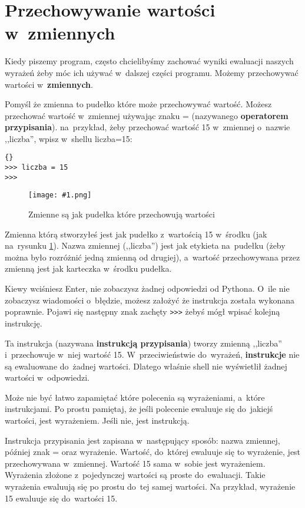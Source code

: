 \documentclass{book}
\newcommand{\img}[3]{
\begin{figure}
\centerline{
	\texttt{[image: \#1.png]}
}
\caption{#2}
\label{#1}
\end{figure}
}
\begin{document}
\section{Przechowywanie wartości w~zmiennych}

Kiedy piszemy program, często chcielibyśmy zachować wyniki ewaluacji naszych wyrażeń żeby móc ich używać w~dalszej części programu. Możemy przechowywać wartości w~{\bf zmiennych}.

Pomyśl że zmienna to pudełko które może przechowywać wartość. Możesz przechować wartość w~zmiennej używając znaku = (nazywanego {\bf operatorem przypisania}). na~przykład, żeby przechować wartość 15 w~zmiennej o~nazwie ,,liczba'', wpisz w~shellu liczba=15:

\lstset{language=python}
\begin{lstlisting}{}
>>> liczba = 15
>>>
\end{lstlisting}

\img{idle-zmienna}{Zmienne są jak pudełka które przechowują wartości}{4 cm}

Zmienna którą stworzyłeś jest jak pudełko z~wartością 15 w~środku (jak na~rysunku \ref{idle-zmienna}). Nazwa zmiennej (,,liczba'') jest jak etykieta na~pudełku (żeby można było rozróżnić jedną zmienną od drugiej), a~wartość przechowywana przez zmienną jest jak karteczka w~środku pudełka.

Kiewy wciśniesz Enter, nie zobaczysz żadnej odpowiedzi od Pythona. O~ile nie zobaczysz wiadomości o~błędzie, możesz założyć że instrukcja została wykonana poprawnie. Pojawi się następny znak zachęty \lstinline{>>>} żebyś mógł wpisać kolejną instrukcję.

Ta instrukcja (nazywana {\bf instrukcją przypisania}) tworzy zmienną ,,liczba'' i~przechowuje w~niej wartość 15. W~przeciwieństwie do~wyrażeń, {\bf instrukcje} nie są ewaluowane do~żadnej wartości. Dlatego właśnie shell nie wyświetlił żadnej wartości w~odpowiedzi.

Może nie być łatwo zapamiętać które polecenia są wyrażeniami, a~które instrukcjami. Po prostu pamiętaj, że jeśli polecenie ewaluuje się do~jakiejś wartości, jest wyrażeniem. Jeśli nie, jest instrukcją.

Instrukcja przypisania jest zapisana w~następujący sposób: nazwa zmiennej, później znak = oraz wyrażenie. Wartość, do~której ewaluuje się to wyrażenie, jest przechowywana w~zmiennej. Wartość 15 sama w~sobie jest wyrażeniem. Wyrażenia złożone z~pojedynczej wartości są proste do~ewaluacji. Takie wyrażenia ewaluują się po prostu do~tej samej wartości. Na przykład, wyrażenie 15 ewaluuje się do~wartości 15.
\end{document}
